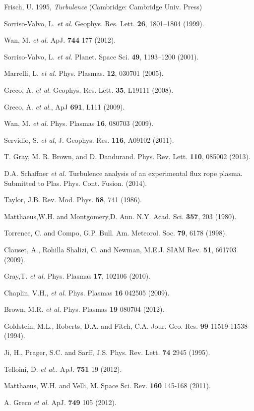 \documentclass[aps,prl,amsmath,amssymb,reprint,superscriptaddress]{revtex4-1} %
\begin{document}
\providecommand{\noopsort}[1]{}\providecommand{\singleletter}[1]{#1}%
\begin{thebibliography}{99}

Frisch, U. 1995, {\it Turbulence} (Cambridge: Cambridge Univ. Press)

Sorriso-Valvo, L. {\it et al.} Geophys. Res. Lett. {\bf 26}, 1801–1804 (1999).

Wan, M. {\it et al.} ApJ. {\bf 744} 177 (2012).

Sorriso-Valvo, L. {\it et al.} Planet. Space Sci. {\bf 49}, 1193–1200 (2001).

Marrelli, L. {\it et al.} Phys. Plasmas. {\bf 12}, 030701 (2005).

Greco, A. {\it et al.} Geophys. Res. Lett. {\bf 35}, L19111 (2008).

Greco, A. {\it et al.}, ApJ {\bf 691}, L111 (2009).

Wan, M. {\it et al.} Phys. Plasmas {\bf 16}, 080703 (2009).

Servidio, S. {\it et al}, J. Geophys. Res. {\bf 116}, A09102 (2011).

T. Gray, M. R. Brown, and D. Dandurand. Phys. Rev. Lett. {\bf 110}, 085002 (2013). 

D.A. Schaffner {\it et al.} Turbulence analysis of an experimental flux rope plasma. Submitted to Plas. Phys. Cont. Fusion. (2014).

Taylor, J.B. Rev. Mod. Phys. {\bf 58}, 741 (1986).

Matthaeus,W.H. and Montgomery,D. Ann. N.Y. Acad. Sci. {\bf 357}, 203 (1980).

Torrence, C. and Compo, G.P. Bull. Am. Meteorol. Soc. {\bf 79}, 6178 (1998).

Clauset, A., Rohilla Shalizi, C. and Newman, M.E.J. SIAM Rev. {\bf 51}, 661703 (2009).

Gray,T. {\it et al.} Phys. Plasmas {\bf 17}, 102106 (2010).

Chaplin, V.H., {\it et al.} Phys. Plasmas {\bf 16} 042505 (2009).

Brown, M.R. {\it et al.} Phys. Plasmas {\bf 19} 080704 (2012).

Goldstein, M.L., Roberts, D.A. and Fitch, C.A. Jour. Geo. Res. {\bf 99} 11519-11538 (1994).

Ji, H., Prager, S.C. and Sarff, J.S. Phys. Rev. Lett. {\bf 74} 2945 (1995).

Telloini, D. {\it et al.}. ApJ. {\bf 751} 19 (2012).

Matthaeus, W.H. and Velli, M. Space Sci. Rev. {\bf 160} 145-168 (2011).

A. Greco {\it et al.} ApJ. {\bf 749} 105 (2012).

\end{thebibliography}
\end{document}
